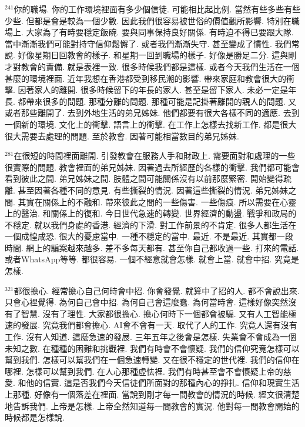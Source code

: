 \documentclass{book}
\begin{document}
$^{241}$你的職場.
你的工作環境裡面有多少個信徒.
可能相比起比例.
當然有些多些有些少些.
但都是會是較為一個少數.
因此我們很容易被世俗的價值觀所影響.
特別在職場上.
大家為了有時要穩定飯碗.
要與同事保持良好關係.
有時迫不得已要跟大隊.
當中漸漸我們可能對持守信仰鬆懈了.
或者我們漸漸失守.
甚至變成了慣性.
我們常說.
好像星期日回教會的樣子.
和星期一回到職場的樣子.
好像是勝足二分.
這與剛才對教會的責備.
就是表裡一致.
很多時候我們都是這樣.
或者今天我們生活在一個甚麼的環境裡面.
近年我想在香港都受到移民潮的影響.
帶來家庭和教會很大的衝擊.
因著家人的離開.
很多時候留下的年長的家人.
甚至是留下家人.
未必一定是年長.
都帶來很多的問題.
那種分離的問題.
那種可能是記掛著離開的親人的問題.
又或者那些離開了.
去到外地生活的弟兄姊妹.
他們都要有很大各樣不同的適應.
去到一個新的環境.
文化上的衝擊.
語言上的衝擊.
在工作上怎樣去找新工作.
都是很大很大需要去處理的問題.
至於教會.
因著可能相當數目的弟兄姊妹.

$^{281}$在很短的時間裡面離開.
引發教會在服務人手和財政上.
需要面對和處理的一些很實際的問題.
教會裡面的弟兄姊妹.
因著過去所經歷的各樣的衝擊.
我們都可能會看到彼此之間.
弟兄姊妹之間.
肢體之間可能關係沒有以前那麼緊密.
開始變得疏離.
甚至因著各種不同的意見.
有些撕裂的情況.
因著這些撕裂的情況.
弟兄姊妹之間.
其實在關係上的不融和.
帶來彼此之間的一些傷害.
一些傷痕.
所以需要在心靈上的醫治.
和關係上的復和.
今日世代急速的轉變.
世界經濟的動盪.
戰爭和政局的不穩定.
就以我們身處的香港.
經濟的下滑.
對工作前景的不肯定.
很多人都生活在一個成惶成恐.
很大的憂慮當中.
一種不穩定的當中.
最近.
不是最近.
其實都一段時間.
網上的騙案越來越多.
差不多每天都有.
甚至你自己都收過一些.
打來的電話.
或者WhatsApp等等.
都很容易.
一個不經意就會怎樣.
就會上當.
就會中招.
究竟是怎樣.

$^{321}$都很擔心.
經常擔心自己何時會中招.
你會發覺.
就算中了招的人.
都不會說出來.
只會心裡覺得.
為何自己會中招.
為何自己會這麼蠢.
為何當時會.
這樣好像突然沒有了智慧.
沒有了理性.
大家都很擔心.
擔心何時下一個都會被騙.
又有人工智能極速的發展.
究竟我們都會擔心.
AI會不會有一天.
取代了人的工作.
究竟人還有沒有工作.
沒有人知道.
這麼急速的發展.
三年五年之後會是怎樣.
失業會不會成為一個未知之數.
在種種的困難和挑戰裡.
我們有時會不會懷疑.
我們的信仰究竟怎樣可以幫到我們.
怎樣可以幫我們在一個急速轉變.
又在很不穩定的世代裡.
我們的信仰在哪裡.
怎樣可以幫到我們.
在人心那種虛怯裡.
我們有時甚至會不會懷疑上帝的慈愛.
和他的信實.
這是否我們今天信徒們所面對的那種內心的掙扎.
信仰和現實生活上那種.
好像有一個落差在裡面.
當說到剛才每一間教會的情況的時候.
經文很清楚地告訴我們.
上帝是怎樣.
上帝全然知道每一間教會的實況.
他對每一間教會開始的時候都是怎樣說.
\end{document}
